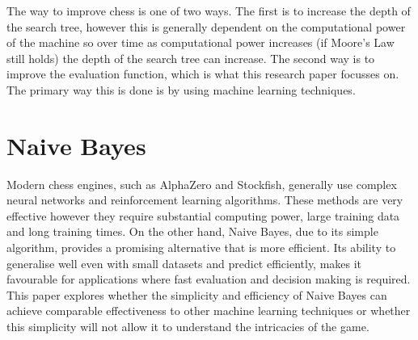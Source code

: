The way to improve chess is one of two ways. The first is to increase the depth of the search tree, however this is generally dependent on the computational power of the machine so over time as computational power increases (if Moore's Law still holds) the depth of the search tree can increase. The second way is to improve the evaluation function, which is what this research paper focusses on. The primary way this is done is by using machine learning techniques. 

\section{Naive Bayes}

Modern chess engines, such as AlphaZero and Stockfish, generally use complex neural networks and reinforcement learning algorithms. These methods are very effective however they require substantial computing power, large training data and long training times. On the other hand, Naive Bayes, due to its simple algorithm, provides a promising alternative that is more efficient. Its ability to generalise well even with small datasets and predict efficiently, makes it favourable for applications where fast evaluation and decision making is required. This paper explores whether the simplicity and efficiency of Naive Bayes can achieve comparable effectiveness to other machine learning techniques or whether this simplicity will not allow it to understand the intricacies of the game.


